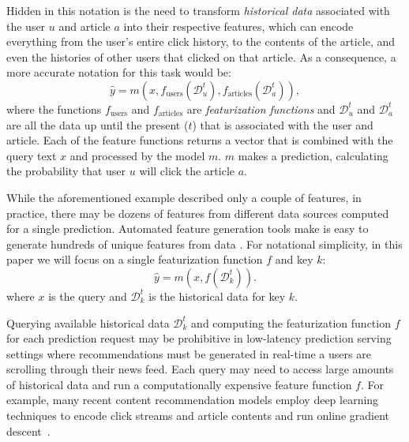 Hidden in this notation is the need to transform \textit{historical data} associated with the user $u$ and article $a$ into their respective features, which can encode everything from the user's entire click history, to the contents of the article, and even the histories of other users that clicked on that article.
As a consequence, a more accurate notation for this task would be:
\begin{equation}
    \hat{y} = m\left(x,
    f_\text{users}\left(\mathcal{D}^{t}_u\right), 
    f_\text{articles}\left(\mathcal{D}^{t}_a\right) 
    \right), 
\end{equation}
where the functions $f_\text{users}$ and $f_\text{articles}$ are \emph{featurization functions} and $\mathcal{D}^{t}_u$ and $\mathcal{D}^{t}_a$ are all the data up until the present ($t$) that is associated with the user and article.
Each of the feature functions returns a vector that is combined with the query text $x$ and processed by the model $m$. $m$ makes a prediction, calculating the probability that user $u$ will click the article $a$.

While the aforementioned example described only a couple of features, in practice, there may be dozens of features from different data sources computed for a single prediction. Automated feature generation tools make is easy to generate hundreds of unique features from data \cite{feature-tools}. For notational simplicity, in this paper we will focus on a single featurization function $f$ and key $k$:
\begin{equation}
    \hat{y} = m\left(x, 
    f\left(\mathcal{D}^{t}_k\right)
    \right). 
\end{equation}
where $x$ is the query and $\mathcal{D}^{t}_k$ is the historical data for key $k$. 

Querying available historical data $\mathcal{D}^{t}_k$ and computing the featurization function $f$ for each prediction request may be prohibitive in low-latency prediction serving settings where recommendations must be generated in real-time a users are scrolling through their news feed.
Each query may need to access large amounts of historical data and run a computationally expensive feature function $f$. For example, many recent content recommendation models employ deep learning techniques to encode click streams and article contents and run online gradient descent~\cite{DLRM19}.
%


